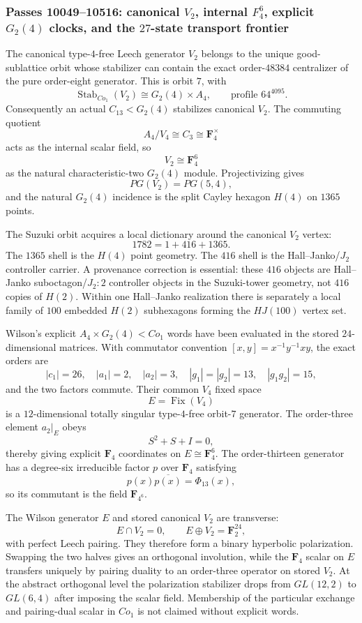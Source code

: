 \subsubsection*{Passes 10049--10516: canonical $V_2$, internal $F_4^6$, explicit $G_2(4)$ clocks, and the $27$-state transport frontier}
The canonical type-$4$-free Leech generator $V_2$ belongs to the unique good-sublattice orbit whose stabilizer can contain the exact order-$48384$ centralizer of the pure order-eight generator.  This is orbit $7$, with
\[
 \operatorname{Stab}_{Co_1}(V_2)\cong G_2(4)\times A_4,
 \qquad \text{profile }64^{4095}.
\]
Consequently an actual $C_{13}<G_2(4)$ stabilizes canonical $V_2$.  The commuting quotient
\[
 A_4/V_4\cong C_3\cong \mathbf F_4^\times
\]
acts as the internal scalar field, so
\[
 \boxed{V_2\cong\mathbf F_4^6}
\]
as the natural characteristic-two $G_2(4)$ module.  Projectivizing gives
\[
 PG(V_2)=PG(5,4),
\]
and the natural $G_2(4)$ incidence is the split Cayley hexagon $H(4)$ on $1365$ points.

The Suzuki orbit acquires a local dictionary around the canonical $V_2$ vertex:
\[
 1782=1+416+1365.
\]
The $1365$ shell is the $H(4)$ point geometry.  The $416$ shell is the Hall--Janko/$J_2$ controller carrier.  A provenance correction is essential: these $416$ objects are Hall--Janko suboctagon/$J_2{:}2$ controller objects in the Suzuki-tower geometry, not $416$ copies of $H(2)$.  Within one Hall--Janko realization there is separately a local family of $100$ embedded $H(2)$ subhexagons forming the $HJ(100)$ vertex set.

Wilson's explicit $A_4\times G_2(4)<Co_1$ words have been evaluated in the stored $24$-dimensional matrices.  With commutator convention $[x,y]=x^{-1}y^{-1}xy$, the exact orders are
\[
 |c_1|=26,\quad |a_1|=2,\quad |a_2|=3,\quad
 |g_1|=|g_2|=13,\quad |g_1g_2|=15,
\]
and the two factors commute.  Their common $V_4$ fixed space
\[
 E=\operatorname{Fix}(V_4)
\]
is a $12$-dimensional totally singular type-$4$-free orbit-$7$ generator.  The order-three element $a_2|_E$ obeys
\[
 S^2+S+I=0,
\]
thereby giving explicit $\mathbf F_4$ coordinates on $E\cong\mathbf F_4^6$.  The order-thirteen generator has a degree-six irreducible factor $p$ over $\mathbf F_4$ satisfying
\[
 p(x)\overline{p(x)}=\Phi_{13}(x),
\]
so its commutant is the field $\mathbf F_{4^6}$.

The Wilson generator $E$ and stored canonical $V_2$ are transverse:
\[
 E\cap V_2=0,\qquad E\oplus V_2=\mathbf F_2^{24},
\]
with perfect Leech pairing.  They therefore form a binary hyperbolic polarization.  Swapping the two halves gives an orthogonal involution, while the $\mathbf F_4$ scalar on $E$ transfers uniquely by pairing duality to an order-three operator on stored $V_2$.  At the abstract orthogonal level the polarization stabilizer drops from $GL(12,2)$ to $GL(6,4)$ after imposing the scalar field.  Membership of the particular exchange and pairing-dual scalar in $Co_1$ is not claimed without explicit words.

